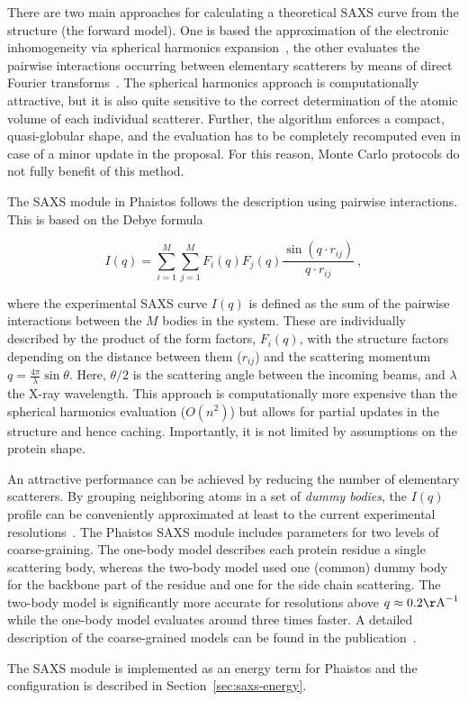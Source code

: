 There are two main approaches for calculating a theoretical SAXS curve
from the structure (the forward model). One is based the approximation
of the electronic inhomogeneity via spherical harmonics
expansion~\cite{svergun1995crysol}, the other evaluates the pairwise
interactions occurring between elementary scatterers by means of
direct Fourier transforms~\cite{glatter1982small}.  The spherical
harmonics approach is computationally attractive, but it is also quite
sensitive to the correct determination of the atomic volume of each
individual scatterer. Further, the algorithm enforces a compact,
quasi-globular shape, and the evaluation has to be completely
recomputed even in case of a minor update in the proposal. For this
reason, Monte Carlo protocols do not fully benefit of this method.

The SAXS module in Phaistos follows the description using
pairwise interactions. This is based on the Debye formula~\cite{Debye-1915}

\begin{equation}
I(q)=\sum_{i=1}^{M}\sum_{j=1}^{M}F_{i}(q)F_{j}(q)\frac{\sin(q\cdot r_{ij})}{q\cdot r_{ij}} \ ,
\end{equation}

\noindent where the experimental SAXS curve $I(q)$ is defined as the
sum of the pairwise interactions between the $M$ bodies in the
system. These are individually described by the product of the form
factors, $F_{i}(q)$, with the structure factors depending on the
distance between them ($r_{ij}$) and the scattering momentum
$q=\frac{4\pi}{\lambda}\sin\theta$. Here, $\theta / 2$ is the
scattering angle between the incoming beams, and $\lambda$ the X-ray
wavelength. This approach is computationally more expensive than the
spherical harmonics evaluation ($O(n^2)$) but allows for partial
updates in the structure and hence caching. Importantly, it is not
limited by assumptions on the protein shape.

An attractive performance can be achieved by reducing the number of
elementary scatterers. By grouping neighboring atoms in a set of
\emph{dummy bodies}, the $I(q)$ profile can be conveniently
approximated at least to the current experimental
resolutions~\cite{stovgaard2010calculation}. The Phaistos SAXS module
includes parameters for two levels of coarse-graining. The one-body
model describes each protein residue a single scattering body, whereas
the two-body model used one (common) dummy body for the backbone part
of the residue and one for the side chain scattering. The two-body
model is significantly more accurate for resolutions above $q \approx
0.2 \mathrm{\AA}^{-1}$ while the one-body model evaluates around three
times faster.  A detailed description of the coarse-grained models can
be found in the publication~\cite{stovgaard2010calculation}.

The SAXS module is implemented as an energy term for Phaistos and the
configuration is described in Section~\ref{sec:saxs-energy}.

